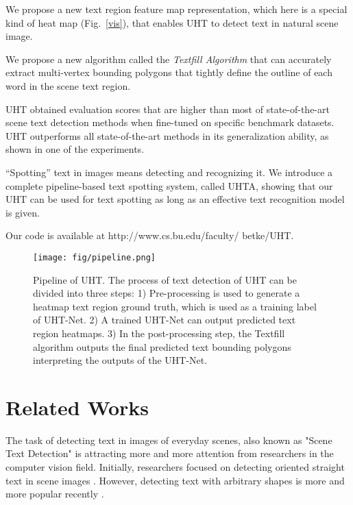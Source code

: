\documentclass[10pt,twocolumn,letterpaper]{article}
\begin{document}
 We propose a new text region feature map representation, which here is a special kind of heat map (Fig.~\ref{vis}), that enables UHT to detect text in natural scene image.

 We propose a new algorithm called the {\em Textfill Algorithm} that can accurately extract multi-vertex bounding polygons that tightly define the outline of each word in the scene text region. 



 UHT obtained evaluation scores that are higher than most of state-of-the-art scene text detection methods when fine-tuned on specific benchmark datasets. UHT outperforms all state-of-the-art methods in its generalization ability, as shown in one of the experiments.


 ``Spotting'' text in images means detecting and recognizing it.  We introduce a complete pipeline-based text spotting system, called UHTA, showing that our UHT can be used for text spotting as long as an effective text recognition model is given.

Our code is available at http://www.cs.bu.edu/faculty/ betke/UHT.


\begin{figure}[t]
\centering
\centering
\texttt{[image: fig/pipeline.png]}
\caption{Pipeline of UHT. The process of text detection of UHT can be divided into three steps: 1) Pre-processing is used to generate a heatmap text region ground truth, which is used as a training label of UHT-Net. 2) A trained UHT-Net can output predicted text region heatmaps. 3) In the post-processing step, the Textfill algorithm outputs the final predicted text bounding polygons interpreting the outputs of the UHT-Net.}
\label{pipeline}
\end{figure}

\section{Related Works}

The task of detecting text in images of everyday scenes, also known as "Scene Text Detection" is attracting more and more attention from researchers in the computer vision field. Initially, researchers focused on detecting oriented straight text in scene images \cite{east, pixellink, DBLP:journals/corr/ZhangZSYLB16, DBLP:journals/corr/YaoBSZZC16, DBLP:journals/corr/HeZYL17}. However, detecting text with arbitrary shapes is more and more popular recently \cite{textsnake, psenet-1s, psenet_v2, lomo-ms, craft, textmountaion, charnet}.
\end{document}
